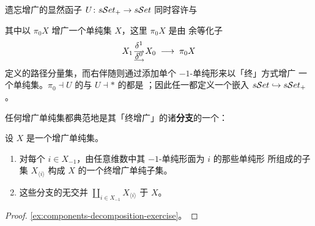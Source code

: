 \begin{observation}[单纯集与增广单纯集]\label{obs:ssets-vs-augmented-ssets}
遗忘增广的显然函子 $U\colon s\mathcal{S}et_{+}\to s\mathcal{S}et$ 同时容许\trLeftAdjoint{}与%
\trRightAdjoint
\begin{center}
\end{center}
其中\trLeftAdjoint{}以 $\pi_{0}X$ 增广一个单纯集 $X$，这里 $\pi_{0}X$ 是由%
余等化子
\begin{equation*}
X_{1}
\;\;\mathop{\mathclap{\substack{\textstyle\delta^{1}\\\longrightarrow\\[-0.6ex]\textstyle\delta^{0}\\[-0.6ex]\longrightarrow}}}\;\;
X_{0}
\;\longrightarrow\;
\pi_{0}X
\end{equation*}
定义的路径分量集，而右伴随则通过添加单个 $-1$-单纯形来以「终」方式增广%
一个单纯集。$\pi_{0}\dashv U$ 的\trUnit{}与 $U\dashv\ast$ 的\trCounit{}都是%
\trIsomorphism；因此任一\trAdjunction{}都定义一个\trFullyFaithful{}嵌入%
$s\mathcal{S}et\hookrightarrow s\mathcal{S}et_{+}$。
\end{observation}

任何增广单纯集都典范地是其「终增广」的诸\textbf{分支}的一个\trCoproduct：
\begin{lemma}\label{lem:components-decomposition}
设 $X$ 是一个增广单纯集。
\begin{enumerate}[label=(\roman*)]
\item 对每个 $i\in X_{-1}$，由任意维数中其 $-1$-单纯形面为 $i$ 的那些单纯形%
所组成的子集 $X_{\langle i\rangle}$ 构成 $X$ 的一个终增广单纯子集。
\item 这些分支的无交并
$\coprod_{i\in X_{-1}}X_{\langle i\rangle}$ \trIsomorphism{}于 $X$。
\end{enumerate}
\end{lemma}

\begin{proof}
\cref{ex:components-decomposition-exercise}。
\end{proof}

